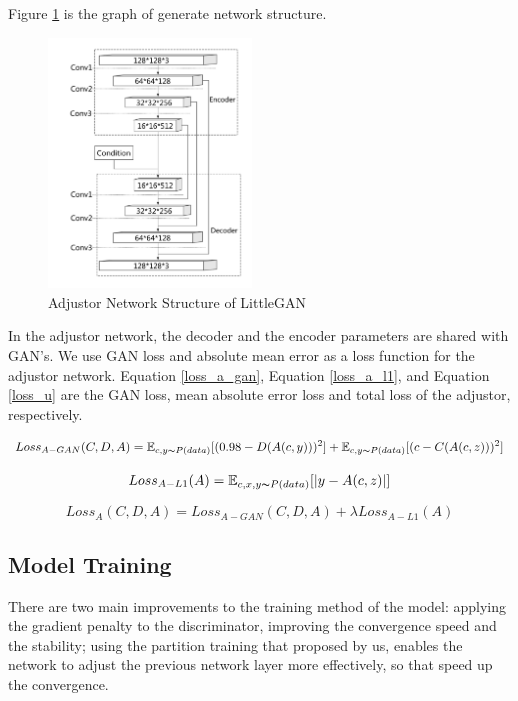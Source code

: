 Figure \ref{net_adjustor} is the graph of generate network structure.

\begin{figure}
    \begin{center}
    \includegraphics[width=0.48\textwidth]{figures/net_adjustor.pdf}
    \caption{Adjustor Network Structure of LittleGAN}
    \label{net_adjustor}
    \end{center}
\end{figure}

In the adjustor network, the decoder and the encoder parameters are shared with GAN's.
We use GAN loss and absolute mean error as a loss function for the adjustor network.
Equation \eqref{loss_a_gan}, Equation \eqref{loss_a_l1}, and Equation \eqref{loss_u} are the GAN loss,
    mean absolute error loss and total loss of the adjustor, respectively.

\begin{equation}
    Loss_{A-GAN}(C,D,A)=
    \mathbb{E}_{c,y\thicksim P(data)}[(0.98-D(A(c,y)))^2]+
    \mathbb{E}_{c,y\thicksim P(data)}[(c-C(A(c,z)))^2]
    \label{loss_a_gan}
\end{equation}

\begin{equation}
    Loss_{A-L1}(A)=
    \mathbb{E}_{c,x,y\thicksim P(data)}[|y-A(c,z)|]
    \label{loss_a_l1}
\end{equation}

\begin{equation}
    Loss_{A}(C,D,A)=
    Loss_{A-GAN}(C,D,A)+
    \lambda Loss_{A-L1}(A)
    \label{loss_u}
\end{equation}

\subsection{Model Training}
There are two main improvements to the training method of the model:
    applying the gradient penalty to the discriminator,
    improving the convergence speed and the stability;
    using the partition training that proposed by us,
    enables the network to adjust the previous network layer more effectively,
    so that speed up the convergence.

